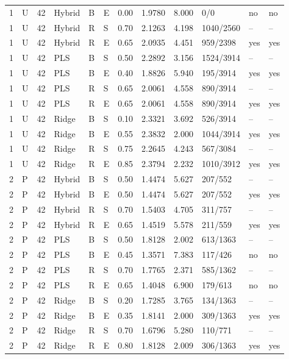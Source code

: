 \documentclass[10pt,a4paper]{article}
\begin{document}
\begin{landscape}
\begin{longtable}{rlrlllrrrlll}
1 & U & 42 & Hybrid & B & E & 0.00 & 1.9780 & 8.000 & 0/0 & no & no \\
1 & U & 42 & Hybrid & R & S & 0.70 & 2.1263 & 4.198 & 1040/2560 & -- & -- \\
1 & U & 42 & Hybrid & R & E & 0.65 & 2.0935 & 4.451 & 959/2398 & yes & yes \\
1 & U & 42 & PLS & B & S & 0.50 & 2.2892 & 3.156 & 1524/3914 & -- & -- \\
1 & U & 42 & PLS & B & E & 0.40 & 1.8826 & 5.940 & 195/3914 & yes & yes \\
1 & U & 42 & PLS & R & S & 0.65 & 2.0061 & 4.558 & 890/3914 & -- & -- \\
1 & U & 42 & PLS & R & E & 0.65 & 2.0061 & 4.558 & 890/3914 & yes & yes \\
1 & U & 42 & Ridge & B & S & 0.10 & 2.3321 & 3.692 & 526/3914 & -- & -- \\
1 & U & 42 & Ridge & B & E & 0.55 & 2.3832 & 2.000 & 1044/3914 & yes & yes \\
1 & U & 42 & Ridge & R & S & 0.75 & 2.2645 & 4.243 & 567/3084 & -- & -- \\
1 & U & 42 & Ridge & R & E & 0.85 & 2.3794 & 2.232 & 1010/3912 & yes & yes \\
2 & P & 42 & Hybrid & B & S & 0.50 & 1.4474 & 5.627 & 207/552 & -- & -- \\
2 & P & 42 & Hybrid & B & E & 0.50 & 1.4474 & 5.627 & 207/552 & yes & yes \\
2 & P & 42 & Hybrid & R & S & 0.70 & 1.5403 & 4.705 & 311/757 & -- & -- \\
2 & P & 42 & Hybrid & R & E & 0.65 & 1.4519 & 5.578 & 211/559 & yes & yes \\
2 & P & 42 & PLS & B & S & 0.50 & 1.8128 & 2.002 & 613/1363 & -- & -- \\
2 & P & 42 & PLS & B & E & 0.45 & 1.3571 & 7.383 & 117/426 & no & no \\
2 & P & 42 & PLS & R & S & 0.70 & 1.7765 & 2.371 & 585/1362 & -- & -- \\
2 & P & 42 & PLS & R & E & 0.65 & 1.4048 & 6.900 & 179/613 & no & no \\
2 & P & 42 & Ridge & B & S & 0.20 & 1.7285 & 3.765 & 134/1363 & -- & -- \\
2 & P & 42 & Ridge & B & E & 0.35 & 1.8141 & 2.000 & 309/1363 & yes & yes \\
2 & P & 42 & Ridge & R & S & 0.70 & 1.6796 & 5.280 & 110/771 & -- & -- \\
2 & P & 42 & Ridge & R & E & 0.80 & 1.8128 & 2.009 & 306/1363 & yes & yes \\

\end{longtable}
\end{landscape}
\end{document}
